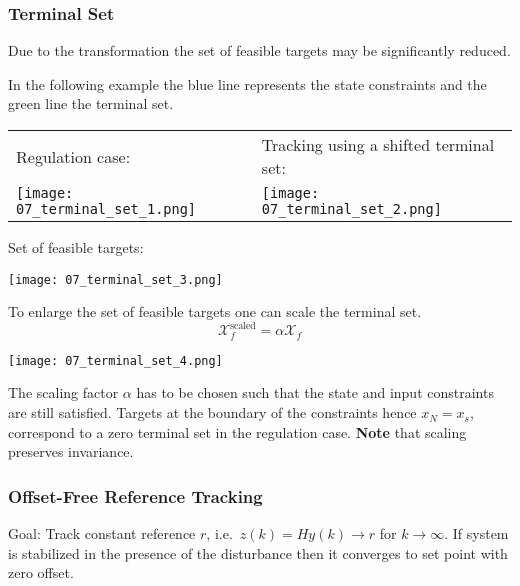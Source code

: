 \subsubsection{Terminal Set}

Due to the transformation the set of feasible targets may be significantly reduced.

\newpar{}

In the following example the blue line represents the state constraints and the green line the terminal set.

\newpar{}

\begin{tabularx}{\linewidth}{YY}
    Regulation case:                                          & Tracking using a shifted terminal set: \\

    \texttt{[image: 07\_terminal\_set\_1.png]} &

    \texttt{[image: 07\_terminal\_set\_2.png]}
\end{tabularx}
\begin{center}
    Set of feasible targets:

    \texttt{[image: 07\_terminal\_set\_3.png]}
\end{center}

\newpar{}

To enlarge the set of feasible targets one can scale the terminal set.
\begin{equation*}
    \mathcal{X}_f^{\text{scaled}} = \alpha \mathcal{X}_f
\end{equation*}
\begin{center}
    \texttt{[image: 07\_terminal\_set\_4.png]}
\end{center}

The scaling factor $\alpha$ has to be chosen such that the state and input constraints are still satisfied.
Targets at the boundary of the constraints hence $x_N = x_s$, correspond to a zero terminal set in the regulation case.
\newpar{}
\textbf{Note} that scaling preserves invariance.
\subsubsection{Offset-Free Reference Tracking}
Goal: Track constant reference $r$, i.e.\ $z(k) = Hy(k) \to r$ for $k \to \infty$. If system is stabilized in the presence of the disturbance then it converges to set point with zero offset.
\newpar{}

